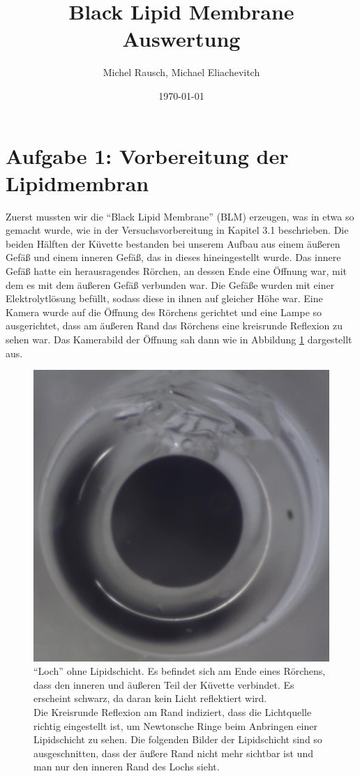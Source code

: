 \documentclass[a4paper,ngerman]{scrartcl}
\title{Black Lipid Membrane\\ Auswertung}
\date{\today}
\author{Michel Rausch, Michael Eliachevitch}
\begin{document}
\maketitle
\tableofcontents
\newpage

\section{Aufgabe 1: Vorbereitung der Lipidmembran}
Zuerst mussten wir die "`Black Lipid Membrane"' (BLM) erzeugen, was in etwa so gemacht wurde, wie in der Versuchsvorbereitung in Kapitel 3.1 beschrieben.
Die beiden Hälften der Küvette bestanden bei unserem Aufbau aus einem äußeren Gefäß und einem inneren Gefäß, das in dieses hineingestellt wurde.
Das innere Gefäß hatte ein herausragendes Rörchen, an dessen Ende eine Öffnung war, mit dem es mit dem äußeren Gefäß verbunden war.
Die Gefäße wurden mit einer Elektrolytlösung befüllt, sodass diese in ihnen auf gleicher Höhe war. Eine Kamera wurde auf die Öffnung des Rörchens
gerichtet und eine Lampe so ausgerichtet, dass am äußeren Rand das Rörchens eine kreisrunde Reflexion zu sehen war. Das Kamerabild der Öffnung sah dann wie in Abbildung \ref{fig:loch} dargestellt aus. 

\begin{figure}[tbh!]
  \centering
  \includegraphics[width=.4\textwidth]{abbildungen/ohnelipidschicht_cut.jpg}
  \caption{"`Loch"' ohne Lipidschicht. Es befindet sich am Ende eines Rörchens, dass den inneren und äußeren Teil der Küvette verbindet.
Es erscheint schwarz, da daran kein Licht reflektiert wird.\\
Die Kreisrunde Reflexion am Rand indiziert, dass die Lichtquelle richtig eingestellt ist, um Newtonsche Ringe beim Anbringen einer
Lipidschicht zu sehen. Die folgenden Bilder der Lipidschicht sind so ausgeschnitten, dass der äußere Rand nicht mehr sichtbar ist und man nur den inneren Rand des Lochs sieht.}
  \label{fig:loch}
\end{figure}
\end{document}
